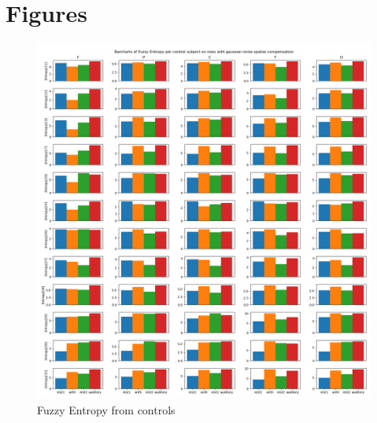 \documentclass[10pt]{article}
\begin{document}
\section{Figures}\label{sec:figures}
\begin{figure}[H]
  \includegraphics[width=16cm]{../../../data_analysis_results/FuzzEnt/Control/all-fuzzyEntr.png}
  \caption{Fuzzy Entropy from controls}
  \label{fig:controlFuzzEnt}
\end{figure}
\end{document}
